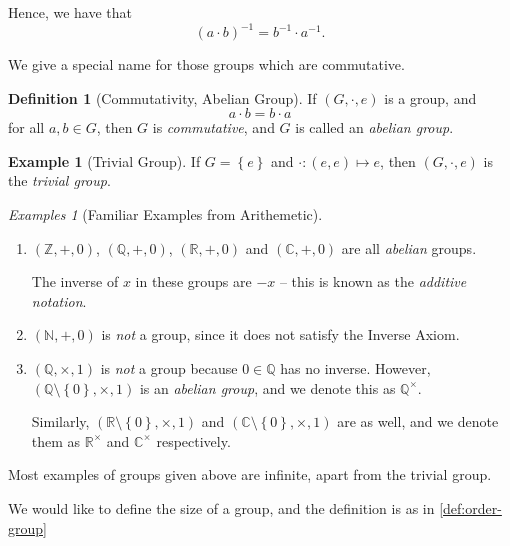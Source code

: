 \documentclass{article}
\theoremstyle{definition}
\newtheorem{definition}[theorem]{Definition}
\newtheorem*{example*}{Example}
\theoremstyle{remark}
\newcommand{\pqty}[1]{\left(#1\right)}
\newcommand{\Bqty}[1]{\left\{#1\right\}}
\newcommand{\functionmap}[3]{#1:#2\mapsto #3}
\newcommand{\inverse}{^{-1}}
\newcommand{\multiplicative}{^{\times}}
\newcommand{\ZZ}{\mathbb{Z}}
\newcommand{\QQ}{\mathbb{Q}}
\newcommand{\RR}{\mathbb{R}}
\newcommand{\CC}{\mathbb{C}}
\newcommand{\NN}{\mathbb{N}}
\newtheorem*{examples*}{Examples}
\begin{document}
Hence, we have that
\[
    \pqty{a \cdot b}\inverse = b \inverse \cdot a \inverse.
\]

We give a special name for those groups which are commutative.

\begin{definition}[Commutativity, Abelian Group]
    \label{def:abelian-group}%
    If \((G, \cdot, e)\) is a group, and
    \[
        a \cdot b = b \cdot a
    \]
    for all \(a, b \in G\), then \(G\) is \emph{commutative}, and \(G\) is called an \emph{abelian group}.
\end{definition}

\begin{example*}[Trivial Group]
    If \(G = \Bqty{e}\) and \(\functionmap{\cdot}{\pqty{e, e}}{e}\), then \(\pqty{G, \cdot, e}\) is the \emph{trivial group}.
\end{example*}

\begin{examples*}[Familiar Examples from Arithemetic]
    \begin{enumerate}
        \item \(\pqty{\ZZ, +, 0}\), \(\pqty{\QQ, +, 0}\), \(\pqty{\RR, +, 0}\) and \(\pqty{\CC, +, 0}\) are all \emph{abelian} groups.
        
        The inverse of \(x\) in these groups are \(-x\) -- this is known as the \emph{additive notation}.

        \item \(\pqty{\NN, +, 0}\) is \emph{not} a group, since it does not satisfy the Inverse Axiom.
        
        \item \(\pqty{\QQ, \times, 1}\) is \emph{not} a group because \(0 \in \QQ\) has no inverse. However, \(\pqty{\QQ \setminus \Bqty{0}, \times, 1}\) is an \emph{abelian group}, and we denote this as \(\QQ\multiplicative\).
        
        Similarly, \(\pqty{\RR \setminus \Bqty{0}, \times, 1}\) and \(\pqty{\CC \setminus \Bqty{0}, \times, 1}\) are as well, and we denote them as \(\RR\multiplicative\) and \(\CC\multiplicative\) respectively.
    \end{enumerate}
\end{examples*}

Most examples of groups given above are infinite, apart from the trivial group.

We would like to define the size of a group, and the definition is as in  \autoref{def:order-group}
\end{document}
